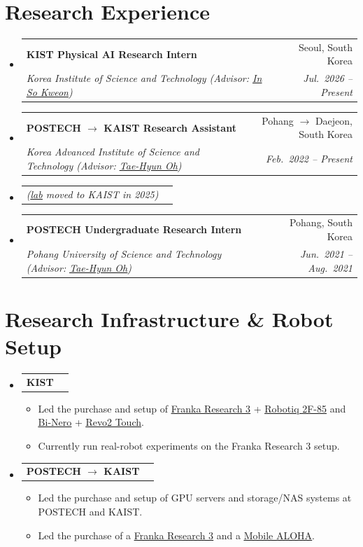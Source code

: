\documentclass[letterpaper,11pt]{article}
\makeatletter
\newcommand{\resumeItem}[1]{
  \item\small{
    {#1 \vspace{-2pt}}
  }
}
\newcommand{\resumeSubheading}[4]{
  \vspace{-2pt}\item
    \begin{tabular*}{0.97\textwidth}[t]{l@{\extracolsep{\fill}}r}
      \textbf{#1} & #2 \\
      \textit{\small#3} & \textit{\small #4} \\
    \end{tabular*}\vspace{-7pt}
}
\newcommand{\resumeSubSubheading}[2]{
    \item
    \begin{tabular*}{0.97\textwidth}{l@{\extracolsep{\fill}}r}
      \textit{\small#1} & \textit{\small #2} \\
    \end{tabular*}\vspace{-7pt}
}
\newcommand{\resumeProjectHeading}[2]{
    \item
    \begin{tabular*}{0.97\textwidth}{l@{\extracolsep{\fill}}r}
      \small#1 & #2 \\
    \end{tabular*}\vspace{-7pt}
}
\newcommand{\resumeSubHeadingListStart}{\begin{itemize}[leftmargin=0.15in, label={}]}
\newcommand{\resumeSubHeadingListEnd}{\end{itemize}}
\newcommand{\resumeItemListStart}{\begin{itemize}}
\newcommand{\resumeItemListEnd}{\end{itemize}\vspace{-5pt}}
\makeatother
\begin{document}
\section{Research Experience}
  \resumeSubHeadingListStart
    \resumeSubheading
      {KIST Physical AI Research Intern}{Seoul, South Korea}
      {Korea Institute of Science and Technology (Advisor: \href{https://scholar.google.com/citations?user=XA8EOlEAAAAJ\&hl=en}{\underline{In So Kweon}})}{Jul.~2026 -- Present}
    \resumeSubheading
      {POSTECH $\rightarrow$ KAIST Research Assistant}{Pohang $\rightarrow$ Daejeon, South Korea}
      {Korea Advanced Institute of Science and Technology (Advisor: \href{https://ami.kaist.ac.kr/members/tae-hyun-oh}{\underline{Tae-Hyun Oh}})}{Feb.~2022 -- Present}
    \resumeSubSubheading{(\href{https://ami.kaist.ac.kr/}{\underline{lab}} moved to KAIST in 2025)}{}
    \resumeSubheading
      {POSTECH Undergraduate Research Intern}{Pohang, South Korea}
      {Pohang University of Science and Technology (Advisor: \href{https://ami.kaist.ac.kr/members/tae-hyun-oh}{\underline{Tae-Hyun Oh}})}{Jun.~2021 -- Aug.~2021}
  \resumeSubHeadingListEnd

\newpage
\section{Research Infrastructure \& Robot Setup}
    \resumeSubHeadingListStart
      \resumeProjectHeading{\textbf{KIST}}{}
      \resumeItemListStart
        \resumeItem{Led the purchase and setup of \href{https://franka.de/franka-research-3}{\underline{Franka Research 3}} + \href{https://robotiq.com/products/adaptive-grippers}{\underline{Robotiq 2F-85}} and \href{https://global.agilex.ai/products/nero}{\underline{Bi-Nero}} + \href{https://brainco.tech/docs/revolimb-hand/en/revo2/parameters.html}{\underline{Revo2 Touch}}.}
        \resumeItem{Currently run real-robot experiments on the Franka Research 3 setup.}
      \resumeItemListEnd
      \resumeProjectHeading{\textbf{POSTECH $\rightarrow$ KAIST}}{}
      \resumeItemListStart
        \resumeItem{Led the purchase and setup of GPU servers and storage/NAS systems at POSTECH and KAIST.}
        \resumeItem{Led the purchase of a \href{https://franka.de/franka-research-3}{\underline{Franka Research 3}} and a \href{https://wego-robotics.com/robot/AGILEX_MOBILE_ALOHA_ver2_detail.php}{\underline{Mobile ALOHA}}.}
      \resumeItemListEnd
    \resumeSubHeadingListEnd
\end{document}
